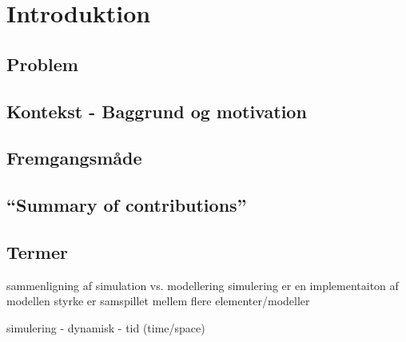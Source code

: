 \chapter{Introduktion}
  \section{Problem}	 
  \section{Kontekst - Baggrund og motivation}
  \section{Fremgangsmåde}
  \section{``Summary of contributions''}
  \section{Termer}


sammenligning af simulation vs. modellering
  simulering er en implementaiton af modellen
  styrke er samspillet mellem flere elementer/modeller


simulering - dynamisk - tid (time/space)


